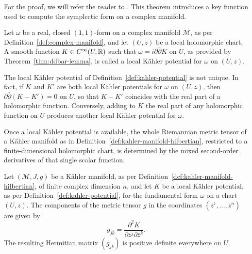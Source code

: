 \noindent For the proof, we will refer the reader to \cite[Theorem 4.17]{ballmannLecturesKahlerManifolds2006}. This theorem introduces a key function used to compute the symplectic form on a complex manifold.

\begin{definition}
	\label{def:kahler-potential}
	Let $\omega$ be a real, closed $(1,1)$-form on a complex manifold
	$\mathcal{M}$, as per Definition~\ref{def:complex-manifold}, and let $(U,z)$ be
	a local holomorphic chart. A smooth function $K\in C^\infty(U,\mathbb{R})$
	such that $\omega=i\partial\bar\partial K$ on $U$, as provided by
	Theorem~\ref{thm:ddbar-lemma}, is called a local Kähler potential for
	$\omega$ on $(U,z)$.
\end{definition}

\begin{remark}
	\label{rem:kahler-potential-uniqueness}
	The local Kähler potential of Definition~\ref{def:kahler-potential} is not unique. In fact, if $K$ and $K'$ are both local Kähler potentials for $\omega$ on $(U,z)$, then $\partial\bar\partial(K-K')=0$ on $U$, so that $K-K'$ coincides with the real part of a holomorphic function. Conversely, adding to $K$ the real part of any holomorphic function on $U$ produces another local Kähler potential for $\omega$.
\end{remark}

\noindent Once a local Kähler potential is available, the whole Riemannian metric tensor of a Kähler manifold as in Definition~\ref{def:kahler-manifold-hilbertian}, restricted to a finite-dimensional holomorphic chart, is determined by the mixed second-order derivatives of that single scalar function.

\begin{theorem}
	\label{thm:metric-local-expression}
	Let $(\mathcal{M}, J, g)$ be a Kähler manifold, as per Definition~\ref{def:kahler-manifold-hilbertian}, of finite complex dimension $n$, and let $K$ be a local Kähler potential, as per Definition~\ref{def:kahler-potential}, for the fundamental form $\omega$ on a chart $(U, z)$. The components of the metric tensor $g$ in the coordinates $(z^1, \dots, z^n)$ are given by
	\begin{equation}
		g_{j\bar{k}} = \frac{\partial^2 K}{\partial z^j \partial \bar{z}^k}.
	\end{equation}
	The resulting Hermitian matrix $(g_{j\bar{k}})$ is positive definite everywhere on $U$.
\end{theorem}

